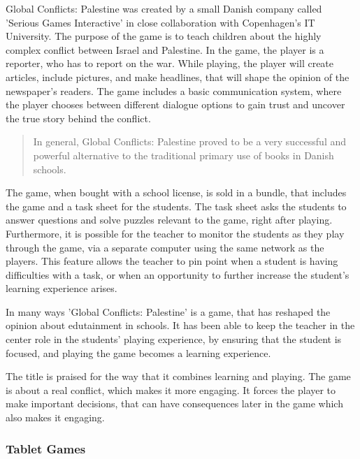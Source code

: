 Global Conflicts: Palestine was created by a small Danish company called 'Serious Games Interactive' in close collaboration with Copenhagen's IT University.
The purpose of the game is to teach children about the highly complex conflict between Israel and Palestine.
In the game, the player is a reporter, who has to report on the war.
While playing, the player will create articles, include pictures, and make headlines, that will shape the opinion of the newspaper's readers.
The game includes a basic communication system, where the player chooses between different dialogue options to gain trust and uncover the true story behind the conflict. 
\begin{quote}
	In general, Global Conflicts: Palestine proved to be a very successful and powerful alternative to the traditional primary use of books in Danish schools.\cite{laeringpaaspil}
\end{quote}
The game, when bought with a school license, is sold in a bundle, that includes the game and a task sheet for the students.
The task sheet asks the students to answer questions and solve puzzles relevant to the game, right after playing.
Furthermore, it is possible for the teacher to monitor the students as they play through the game, via a separate computer using the same network as the players.
This feature allows the teacher to pin point when a student is having difficulties with a task, or when an opportunity to further increase the student's learning experience arises.\newline

In many ways 'Global Conflicts: Palestine' is a game, that has reshaped the opinion about edutainment in schools. It has been able to keep the teacher in the center role in the students' playing experience, by ensuring that the student is focused, and playing the game becomes a learning experience.\cite{laeringpaaspil}\newline

The title is praised for the way that it combines learning and playing.
The game is about a real conflict, which makes it more engaging.
It forces the player to make important decisions, that can have consequences later in the game which also makes it engaging.

\subsubsection{Tablet Games}

